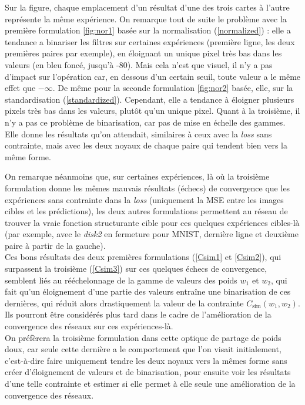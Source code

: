 \vspace{-3.5mm}
Sur la figure, chaque emplacement d'un résultat d'une des trois cartes à l'autre représente la même expérience.
On remarque tout de suite le problème avec la première formulation \ref{fig:nor1} basée sur la normalisation (\ref{normalized}) : elle a tendance a binariser les filtres sur certaines expériences (première ligne, les deux premières paires par exemple), en éloignant un unique pixel très bas dans les valeurs (en bleu foncé, jusqu'à -80). Mais cela n'est que visuel, il n'y a pas d'impact sur l'opération car, en dessous d'un certain seuil, toute valeur a le même effet que $-\infty$.
De même pour la seconde formulation \ref{fig:nor2} basée, elle, sur la standardisation (\ref{standardized}). Cependant, elle a tendance à éloigner plusieurs pixels très bas dans les valeurs, plutôt qu'un unique pixel. Quant à la troisième, il n'y a pas ce problème de binarisation, car pas de mise en échelle des gammes. Elle donne les résultats qu'on attendait, similaires à ceux avec la \textit{loss} sans contrainte, mais avec les deux noyaux de chaque paire qui tendent bien vers la même forme. 



\newpage

On remarque néanmoins que, sur certaines expériences, là où la troisième formulation donne les mêmes mauvais résultats (échecs) de convergence que les expériences sans contrainte dans la \textit{loss} (uniquement la MSE entre les images cibles et les prédictions), les deux autres formulations permettent au réseau de trouver la vraie fonction structurante cible pour ces quelques expériences cibles-là (par exemple, avec le \textit{disk2} en fermeture pour MNIST, dernière ligne et deuxième paire à partir de la gauche).\\

\vspace{-2.0mm}
\noindent Ces bons résultats des deux premières formulations (\ref{Csim1} et \ref{Csim2}), qui surpassent la troisième (\ref{Csim3}) sur ces quelques échecs de convergence, semblent liés au rééchelonnage de la gamme de valeurs des poids $w_1$ et $w_2$, qui fait qu'un éloignement d'une partie des valeurs entraîne une binarisation de ces dernières, qui réduit alors drastiquement la valeur de la contrainte $C_\text{sim}(w_1,w_2)$. Ils pourront être considérés plus tard dans le cadre de l'amélioration de la convergence des réseaux sur ces expériences-là. \\

\vspace{-2.0mm}
\noindent On préfèrera la troisième formulation dans cette optique de partage de poids doux, car seule cette dernière a le comportement que l'on visait initialement, c'est-à-dire faire uniquement tendre les deux noyaux vers la mêmes forme sans créer d'éloignement de valeurs et de binarisation, pour ensuite voir les résultats d'une telle contrainte et estimer si elle permet à elle seule une amélioration de la convergence des réseaux.
